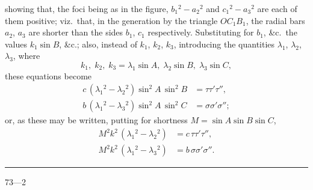\documentclass[12pt,a4paper]{article}
\begin{document}
showing that, the foci being as in the figure, $b_1{}^{\!2} - a_2{}^{\!2}$ and $c_1{}^{\!2} - a_3{}^{\!2}$ are each of them positive; viz.\ that, in the generation by the triangle $OC_1B_1$, the radial bars $a_2$, $a_3$ are shorter than the sides $b_1$, $c_1$ respectively. Substituting for $b_1$, \&c.\ the values $k_1\sin B$, \&c.; also, instead of $k_1$, $k_2$, $k_3$, introducing the quantities $\lambda_1$, $\lambda_2$, $\lambda_3$, where
\[
k_1,\; k_2,\; k_3 = \lambda_1\sin A,\; \lambda_2\sin B,\; \lambda_3\sin C,
\]
these equations become
\begin{align*}
c\, (\lambda_1{}^{\!2} - \lambda_2{}^{\!2}) \sin^2 A \, \sin^2 B &= \tau\tau'\tau'', \\
b\, (\lambda_1{}^{\!2} - \lambda_3{}^{\!2}) \sin^2 A \, \sin^2 C &= \sigma\sigma'\sigma'';
\end{align*}
or, as these may be written, putting for shortness $M = \sin A \sin B \sin C$,
\begin{align*}
M^2 k^2\, (\lambda_1{}^{\!2} - \lambda_2{}^{\!2}) &= c\, \tau\tau'\tau'', \\
M^2 k^2\, (\lambda_1{}^{\!2} - \lambda_3{}^{\!2}) &= b\, \sigma\sigma'\sigma''.
\end{align*}

\vspace{1ex}
\noindent\rule{2em}{0.4pt}\hfill 73---2
\newpage
\end{document}
